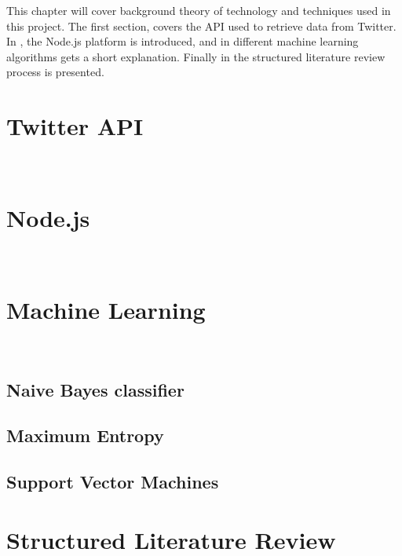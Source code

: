 This chapter will cover background theory of technology and techniques used in this project. 
The first section,  covers the API used to retrieve data from Twitter. In , the Node.js platform is introduced, and in  different machine learning algorithms gets a short explanation. Finally in  the structured literature review process is presented. 


\section{Twitter API}~\label{sec:twitterapi}


\section{Node.js}~\label{sec:nodejs}
	

\section{Machine Learning}~\label{sec:ml}
	\subsection{Naive Bayes classifier}
	
	
	\subsection{Maximum Entropy}
	
	
	\subsection{Support Vector Machines}
	

\section{Structured Literature Review}~\label{sec:backgroundslr}
